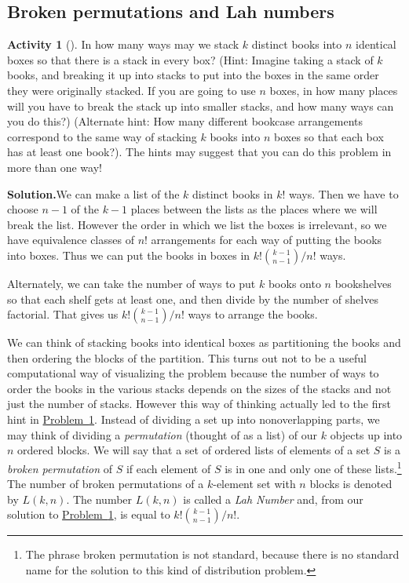 \documentclass[10pt,]{book}
\theoremstyle{plain}
\theoremstyle{definition}
\newtheorem{activity}[project]{Activity}
\numberwithin{equation}{chapter}
\begin{document}
\subsection[{Broken permutations and Lah numbers}]{Broken permutations and Lah numbers}\label{subsection-7}
\begin{activity}[]\label{brokenpermutation}
In how many ways may we stack \(k\) distinct books into \(n\) identical boxes so that there is a stack in every box? (Hint: Imagine taking a stack of \(k\) books, and breaking it up into stacks to put into the boxes in the same order they were originally stacked. If you are going to use \(n\) boxes, in how many places will you have to break the stack up into smaller stacks, and how many ways can you do this?) (Alternate hint: How many different bookcase arrangements correspond to the same way of stacking \(k\) books into \(n\) boxes so that each box has at least one book?). The hints may suggest that you can do this problem in more than one way!%
\par\medskip\noindent%
\textbf{Solution.}\quad We can make a list of the \(k\) distinct books in \(k!\) ways. Then we have to choose \(n-1\) of the \(k-1\) places between the lists as the places where we will break the list. However the order in which we list the boxes is irrelevant, so we have equivalence classes of \(n!\) arrangements for each way of putting the books into boxes. Thus we can put the books in boxes in \(k!{k-1\choose n-1}/n!\) ways.%
\par
Alternately, we can take the number of ways to put \(k\) books onto \(n\) bookshelves so that each shelf gets at least one, and then divide by the number of shelves factorial. That gives us \(k!{k-1\choose n-1}/n!\) ways to arrange the books.%
\end{activity}
We can think of stacking books into identical boxes as partitioning the books and then ordering the blocks of the partition. This turns out not to be a useful computational way of visualizing the problem because the number of ways to order the books in the various stacks depends on the sizes of the stacks and not just the number of stacks. However this way of thinking actually led to the first hint in \hyperref[brokenpermutation]{Problem~\ref{brokenpermutation}}. Instead of dividing a set up into nonoverlapping parts, we may think of dividing a \emph{permutation} (thought of as a list) of our \(k\) objects up into \(n\) ordered blocks. We will say that a set of ordered lists of elements of a set \(S\) is a \emph{broken permutation} of \(S\) if each element of \(S\) is in one and only one of these lists.\footnote{The phrase broken permutation is not standard, because there is no standard name for the solution to this kind  of distribution problem.\label{fn-4}} The number of broken permutations of a \(k\)-element set with \(n\) blocks is denoted by \(L(k,n)\). The number \(L(k,n)\) is called a \emph{Lah Number} and, from our solution to \hyperref[brokenpermutation]{Problem~\ref{brokenpermutation}}, is equal to \(k!{k-1\choose n-1}/n!\).%
\end{document}
